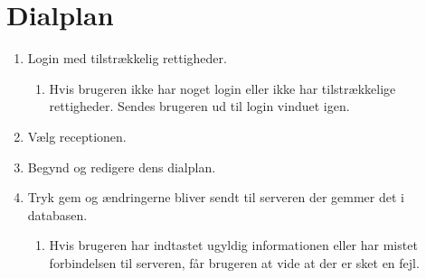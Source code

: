 \section{Dialplan}
\begin{enumerate}
    \item Login med tilstrækkelig rettigheder.
  \begin{enumerate}
    \item Hvis brugeren ikke har noget login eller ikke har tilstrækkelige rettigheder. Sendes brugeren ud til login vinduet igen.
  \end{enumerate}
    \item Vælg receptionen.
    \item Begynd og redigere dens dialplan.
    \item Tryk gem og ændringerne bliver sendt til serveren der gemmer det i databasen.
  \begin{enumerate}
    \item Hvis brugeren har indtastet ugyldig informationen eller har mistet forbindelsen til serveren, får brugeren at vide at der er sket en fejl.
  \end{enumerate}
\end{enumerate}